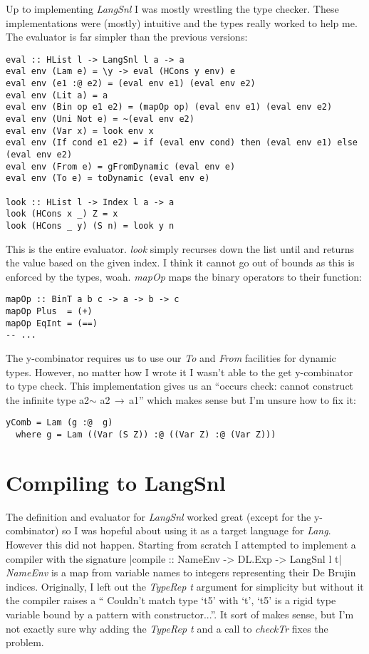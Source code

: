 \documentclass{article}
\begin{document}
Up to implementing \textit{LangSnl} I was mostly wrestling the type checker. These implementations were (mostly) intuitive and the types really worked to help me. The evaluator is far simpler than the previous versions:

\begin{verbatim}
eval :: HList l -> LangSnl l a -> a
eval env (Lam e) = \y -> eval (HCons y env) e
eval env (e1 :@ e2) = (eval env e1) (eval env e2)
eval env (Lit a) = a
eval env (Bin op e1 e2) = (mapOp op) (eval env e1) (eval env e2)
eval env (Uni Not e) = ~(eval env e2)
eval env (Var x) = look env x
eval env (If cond e1 e2) = if (eval env cond) then (eval env e1) else (eval env e2)
eval env (From e) = gFromDynamic (eval env e)
eval env (To e) = toDynamic (eval env e)

look :: HList l -> Index l a -> a
look (HCons x _) Z = x
look (HCons _ y) (S n) = look y n
\end{verbatim}
This is the entire evaluator. \textit{look} simply recurses down the list until and returns the value based on the given index. I think it cannot go out of bounds as this is enforced by the types, woah. \textit{mapOp} maps the binary operators to their function:
\begin{verbatim}
mapOp :: BinT a b c -> a -> b -> c
mapOp Plus  = (+)
mapOp EqInt = (==)
-- ...
\end{verbatim}
The y-combinator requires us to use our \textit{To} and \textit{From} facilities for dynamic
types. However, no matter how I wrote it I wasn't able to the get y-combinator to type check. This implementation gives us an ``occurs check: cannot construct the infinite type a2$\sim$ a2$\,\to\,$a1'' which makes sense but I'm unsure how to fix it:
\begin{verbatim}
yComb = Lam (g :@  g)
  where g = Lam ((Var (S Z)) :@ ((Var Z) :@ (Var Z)))
\end{verbatim}

\section*{Compiling to LangSnl}
The definition and evaluator for \textit{LangSnl} worked great (except for the y-combinator) so I was hopeful about using it as a target language for \textit{Lang}. However this did not happen. Starting from scratch I attempted to implement a compiler with the signature |compile :: NameEnv -> DL.Exp -> LangSnl l t| \textit{NameEnv} is a map from variable names to integers representing their De Brujin indices. Originally, I left out the \textit{TypeRep t} argument for simplicity but without it the compiler raises a `` Couldn't match type ‘t5’ with ‘t’, ‘t5’ is a rigid type variable bound by a pattern with constructor...''. It sort of makes sense, but I'm not exactly sure why adding the \textit{TypeRep t} and a call to \textit{checkTr} fixes the problem.
\end{document}
